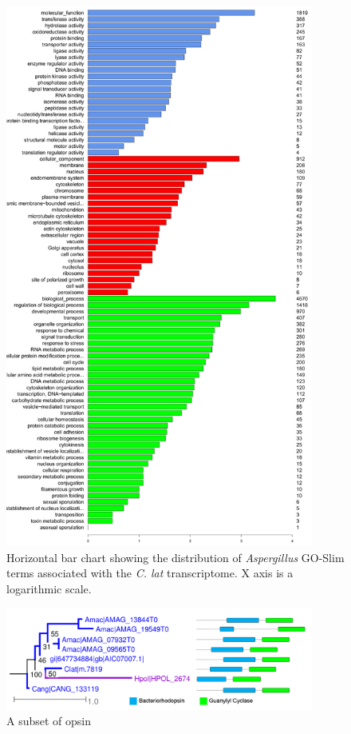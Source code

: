 \begin{figure}[hb]
  \centering
  \includegraphics[width=4in]{./Chapter_Coelomomyces/img/Clat_aspergillus_GOPlot.png}
  \caption[Distribution of \textit{Aspergillus} GO-Slim terms associated with \textit{C. lat} transcriptome.]{Horizontal bar chart showing the distribution of \textit{Aspergillus} GO-Slim terms associated with the \textit{C. lat} transcriptome. X axis is a logarithmic scale.}
  \label{fig:ChClat_GOPlot}
\end{figure}
\begin{figure}[hb]
  \centering
  \includegraphics[width=4in]{./Chapter_Coelomomyces/img/OpsinGCFusion_chytridCluster.png}
  \caption[Opsin-GC fusion proteins; Chytridiomycota and Blastocladiomycota cluster]{A subset of opsin}
  \label{fig:ChClat_OpsinGC}
\end{figure}
